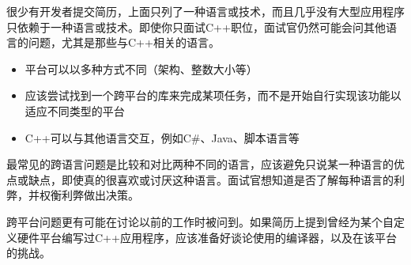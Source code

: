
很少有开发者提交简历，上面只列了一种语言或技术，而且几乎没有大型应用程序只依赖于一种语言或技术。即使你只面试C++职位，面试官仍然可能会问其他语言的问题，尤其是那些与C++相关的语言。


\begin{itemize}
\item
平台可以以多种方式不同（架构、整数大小等）

\item
应该尝试找到一个跨平台的库来完成某项任务，而不是开始自行实现该功能以适应不同类型的平台

\item
C++可以与其他语言交互，例如C\#、Java、脚本语言等
\end{itemize}


最常见的跨语言问题是比较和对比两种不同的语言，应该避免只说某一种语言的优点或缺点，即使真的很喜欢或讨厌这种语言。面试官想知道是否了解每种语言的利弊，并权衡利弊做出决策。

跨平台问题更有可能在讨论以前的工作时被问到。如果简历上提到曾经为某个自定义硬件平台编写过C++应用程序，应该准备好谈论使用的编译器，以及在该平台的挑战。







